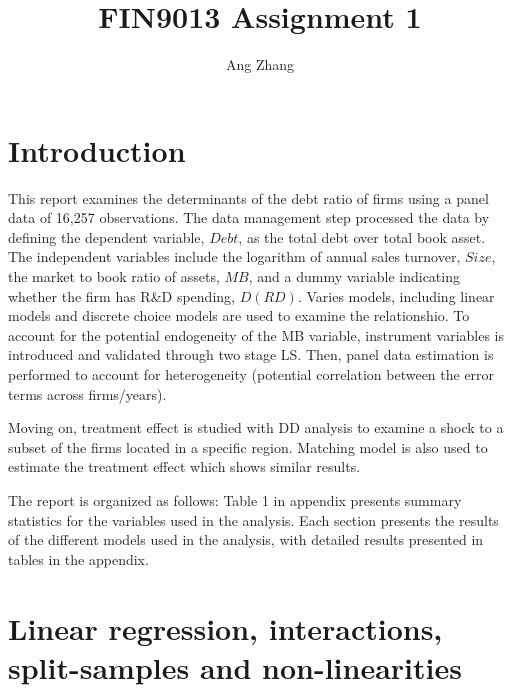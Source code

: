 \documentclass[12pt, times]{article}
\title{FIN9013 Assignment 1}
\author{Ang Zhang}
\begin{document}
\maketitle

\onehalfspacing

\section*{Introduction}
This report examines the determinants of the debt ratio of firms using a panel data of 16,257 observations.
The data management step processed the data by defining the dependent variable, $Debt$, as the total debt over total book asset.
The independent variables include the logarithm of annual sales turnover, $Size$, the market to book ratio of assets, $MB$,
and a dummy variable indicating whether the firm has R\&D spending, $D(RD)$.
Varies models, including linear models and discrete choice models are used to examine the relationshio.
To account for the potential endogeneity of the MB variable, instrument variables is introduced and
validated through two stage LS. Then, panel data estimation is performed to account for
heterogeneity (potential correlation between the error terms across firms/years).

Moving on, treatment effect is studied with DD analysis to examine a shock to a subset of the firms 
located in a specific region. Matching model is also used to estimate the treatment effect which shows similar results.

The report is organized as follows: Table 1 in appendix presents summary statistics for the variables used in the analysis.
Each section presents the results of the different models used in the analysis, with detailed results
presented in tables in the appendix.

\section*{Linear regression, interactions, split-samples and non-linearities}
\end{document}
